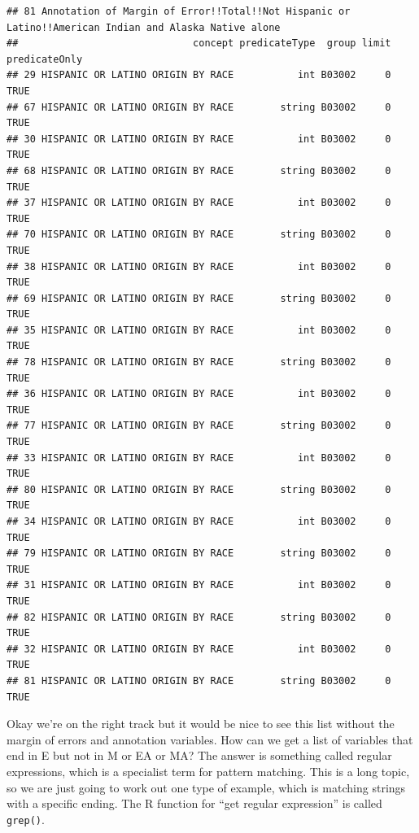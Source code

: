 \documentclass[
  openany]{book}
\newenvironment{Shaded}{\begin{snugshade}}{\end{snugshade}}
\newcommand{\CommentTok}[1]{\textcolor[rgb]{0.56,0.35,0.01}{\textit{#1}}}
\newcommand{\FunctionTok}[1]{\textcolor[rgb]{0.00,0.00,0.00}{#1}}
\newcommand{\NormalTok}[1]{#1}
\newcommand{\OtherTok}[1]{\textcolor[rgb]{0.56,0.35,0.01}{#1}}
\newcommand{\StringTok}[1]{\textcolor[rgb]{0.31,0.60,0.02}{#1}}
\begin{document}
\begin{verbatim}
## 81 Annotation of Margin of Error!!Total!!Not Hispanic or Latino!!American Indian and Alaska Native alone
##                              concept predicateType  group limit predicateOnly
## 29 HISPANIC OR LATINO ORIGIN BY RACE           int B03002     0          TRUE
## 67 HISPANIC OR LATINO ORIGIN BY RACE        string B03002     0          TRUE
## 30 HISPANIC OR LATINO ORIGIN BY RACE           int B03002     0          TRUE
## 68 HISPANIC OR LATINO ORIGIN BY RACE        string B03002     0          TRUE
## 37 HISPANIC OR LATINO ORIGIN BY RACE           int B03002     0          TRUE
## 70 HISPANIC OR LATINO ORIGIN BY RACE        string B03002     0          TRUE
## 38 HISPANIC OR LATINO ORIGIN BY RACE           int B03002     0          TRUE
## 69 HISPANIC OR LATINO ORIGIN BY RACE        string B03002     0          TRUE
## 35 HISPANIC OR LATINO ORIGIN BY RACE           int B03002     0          TRUE
## 78 HISPANIC OR LATINO ORIGIN BY RACE        string B03002     0          TRUE
## 36 HISPANIC OR LATINO ORIGIN BY RACE           int B03002     0          TRUE
## 77 HISPANIC OR LATINO ORIGIN BY RACE        string B03002     0          TRUE
## 33 HISPANIC OR LATINO ORIGIN BY RACE           int B03002     0          TRUE
## 80 HISPANIC OR LATINO ORIGIN BY RACE        string B03002     0          TRUE
## 34 HISPANIC OR LATINO ORIGIN BY RACE           int B03002     0          TRUE
## 79 HISPANIC OR LATINO ORIGIN BY RACE        string B03002     0          TRUE
## 31 HISPANIC OR LATINO ORIGIN BY RACE           int B03002     0          TRUE
## 82 HISPANIC OR LATINO ORIGIN BY RACE        string B03002     0          TRUE
## 32 HISPANIC OR LATINO ORIGIN BY RACE           int B03002     0          TRUE
## 81 HISPANIC OR LATINO ORIGIN BY RACE        string B03002     0          TRUE
\end{verbatim}

Okay we're on the right track but it would be nice to see this list without the margin of errors and annotation variables. How can we get a list of variables that end in E but not in M or EA or MA? The answer is something called regular expressions, which is a specialist term for pattern matching. This is a long topic, so we are just going to work out one type of example, which is matching strings with a specific ending. The R function for ``get regular expression'' is called \texttt{grep()}.

\begin{Shaded}
\end{Shaded}
\end{document}
